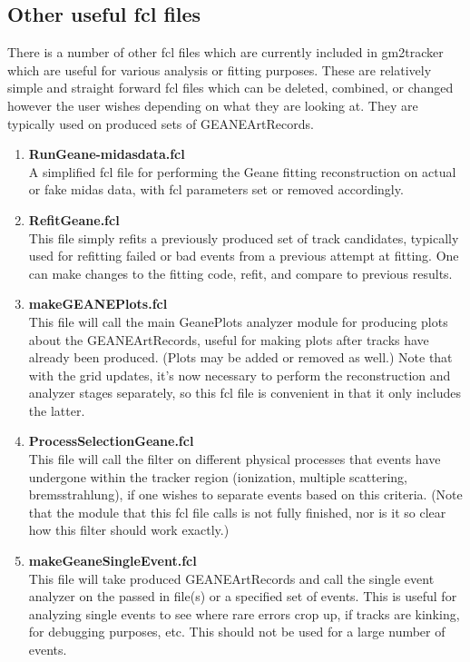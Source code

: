   \subsection{Other useful fcl files}

    There is a number of other fcl files which are currently included in gm2tracker which are useful for various analysis or fitting purposes. These are relatively simple and straight forward fcl files which can be deleted, combined, or changed however the user wishes depending on what they are looking at. They are typically used on produced sets of GEANEArtRecords.

    \begin{enumerate}

      \item{\bf{RunGeane-midasdata.fcl}} \\
      A simplified fcl file for performing the Geane fitting reconstruction on actual or fake midas data, with fcl parameters set or removed accordingly.

      \item{\bf{RefitGeane.fcl}} \\
      This file simply refits a previously produced set of track candidates, typically used for refitting failed or bad events from a previous attempt at fitting. One can make changes to the fitting code, refit, and compare to previous results.

      \item{\bf{makeGEANEPlots.fcl}} \\
      This file will call the main GeanePlots analyzer module for producing plots about the GEANEArtRecords, useful for making plots after tracks have already been produced. (Plots may be added or removed as well.) Note that with the grid updates, it's now necessary to perform the reconstruction and analyzer stages separately, so this fcl file is convenient in that it only includes the latter.

      \item{\bf{ProcessSelectionGeane.fcl}} \\
      This file will call the filter on different physical processes that events have undergone within the tracker region (ionization, multiple scattering, bremsstrahlung), if one wishes to separate events based on this criteria. (Note that the module that this fcl file calls is not fully finished, nor is it so clear how this filter should work exactly.)

      \item{\bf{makeGeaneSingleEvent.fcl}} \\
      This file will take produced GEANEArtRecords and call the single event analyzer on the passed in file(s) or a specified set of events. This is useful for analyzing single events to see where rare errors crop up, if tracks are kinking, for debugging purposes, etc. This should not be used for a large number of events.


\end{enumerate}
